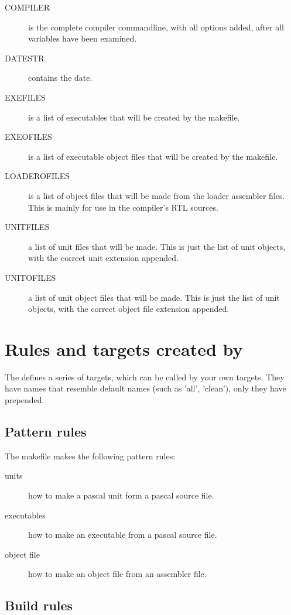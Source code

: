\documentclass{report}
\begin{document}
\begin{description}
\item[COMPILER] is the complete compiler commandline, with all options
added, after all  variables have been examined.
\item[DATESTR] contains the date.
\item[EXEFILES] is a list of executables that will be created by the
makefile.
\item[EXEOFILES] is a list of executable object files that will be created
by the makefile.
\item[LOADEROFILES] is a list of object files that will be made from the
loader assembler files. This is mainly for use in the compiler's RTL sources.
\item[UNITFILES] a list of unit files that will be made. This is just 
the list of unit objects, with the correct unit extension appended.
\item[UNITOFILES] a list of unit object files that will be made. 
This is just the list of unit objects, with the correct object file
extension appended.
\end{description}

\section{Rules and targets created by }

The  defines a series of targets, which can be called by
your own targets. They have names that resemble default names (such as
'all', 'clean'), only they have  prepended.

\subsection{Pattern rules}

The makefile makes the following pattern rules:
\begin{description}
\item[units] how to make a pascal unit form a pascal source file.
\item[executables] how to make an executable from a pascal source file.
\item[object file] how to make an object file from an assembler file.
\end{description}

\subsection{Build rules}
\end{document}
